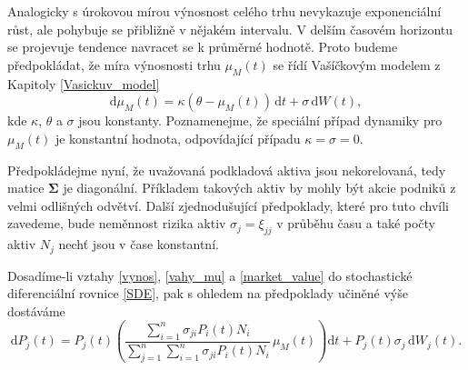 \documentclass[a4paper,12pt]{report}
\theoremstyle{definition} \newtheorem{definice}[veta]{Definice}
\theoremstyle{remark}
\begin{document}
Analogicky s úrokovou mírou výnosnost celého trhu nevykazuje exponenciální růst, ale pohybuje se přibližně v nějakém intervalu. 
V delším časovém horizontu se projevuje tendence navracet se k průměrné hodnotě.
Proto budeme předpokládat, že míra výnosnosti trhu $\mu_M(t)$ se řídí Vašíčkovým modelem z Kapitoly \ref{Vasickuv_model}
\begin{equation} 
\mathrm{d}\mu_M(t)=\kappa(\theta-\mu_M(t))\,\mathrm{d}t+\sigma\,\mathrm{d}W(t),
\end{equation}
kde $\kappa$, $\theta$ a $\sigma$ jsou konstanty.
Poznamenejme, že speciální případ dynamiky pro $\mu_M(t)$ je konstantní hodnota, odpovídající případu $\kappa=\sigma=0$.

Předpokládejme nyní, že uvažovaná podkladová aktiva jsou nekorelovaná, tedy matice $\boldsymbol{\Sigma}$ je diagonální.
Příkladem takových aktiv by mohly být akcie podniků z velmi odlišných odvětví.
Další zjednodušující předpoklady, které pro tuto chvíli zavedeme, bude neměnnost rizika aktiv $\sigma_j=\xi_{jj}$ v průběhu času a také počty aktiv $N_j$ nechť jsou v čase konstantní.

Dosadíme-li vztahy \eqref{vynos}, \eqref{vahy_mu} a \eqref{market_value} do stochastické diferenciální rovnice \eqref{SDE}, pak s ohledem na předpoklady učiněné výše dostáváme
\begin{equation}  \label{SDE_cen_diag}
\mathrm{d}P_j(t)=P_j(t)\left(\frac{\sum\limits_{i=1}^n\sigma_{ji}P_i(t)N_i}{\sum\limits_{j=1}^n\sum\limits_{i=1}^n\sigma_{ji}P_i(t)N_i}\, \mu_M(t)\right)\mathrm{d}t+P_j(t)\sigma_{j}\,\mathrm{d}W_j(t).
\end{equation}
\end{document}
